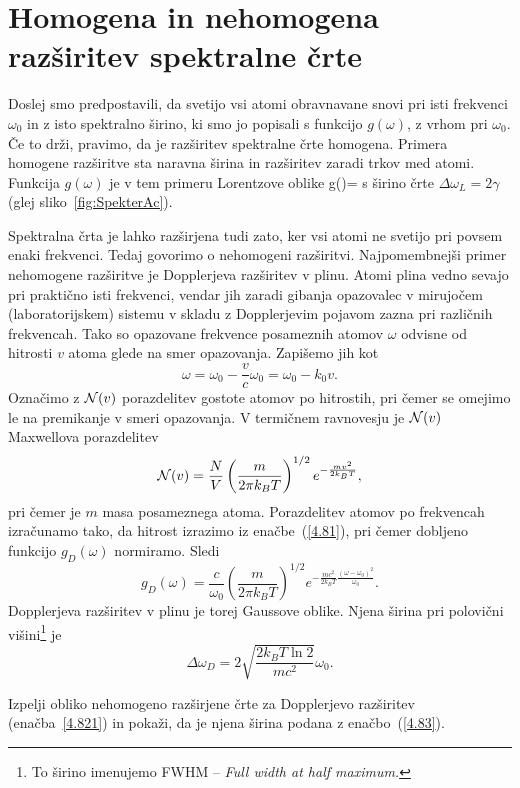 \section{Homogena in nehomogena razširitev spektralne črte}
\label{Razsiritev}
Doslej smo predpostavili, da svetijo vsi atomi obravnavane snovi
pri isti frekvenci $\omega_{0}$ in z isto spektralno širino, ki smo
jo popisali s funkcijo $g(\omega)$, z vrhom pri $\omega_0$. Če to drži, 
pravimo, da je razširitev spektralne črte homogena. 
Primera homogene razširitve sta naravna širina in razširitev zaradi trkov med atomi. 
Funkcija $g(\omega)$ je v tem primeru Lorentzove oblike 
\beq
g(\omega)=
\eeq
s širino črte $\Delta \omega_L = 2\gamma$ (glej sliko~\ref{fig:SpekterAc}). 

Spektralna črta je lahko razširjena tudi zato, ker vsi atomi ne svetijo
pri povsem enaki frekvenci. Tedaj govorimo o nehomogeni 
razširitvi.
Najpomembnejši primer nehomogene razširitve je Dopplerjeva 
 razširitev v plinu. 
Atomi plina vedno sevajo pri praktično isti frekvenci, vendar jih zaradi gibanja
opazovalec v mirujočem (laboratorijskem) sistemu v skladu z Dopplerjevim pojavom 
zazna pri različnih frekvencah. Tako so opazovane frekvence posameznih atomov $\omega$
odvisne od hitrosti $v$ atoma glede na smer opazovanja. Zapišemo jih kot  
\begin{equation}
\omega=\omega_{0}-\frac{v}{c}\omega_{0}=\omega_{0}-k_{0}v.
\label{4.81}
\end{equation}
Označimo z ${\cal N}(v)$ porazdelitev gostote atomov po hitrostih, pri čemer se omejimo 
le na premikanje v smeri opazovanja. V termičnem ravnovesju je ${\cal N}(v)$
Maxwellova porazdelitev
\begin{equation}
{\cal N}(v)=\frac{N}{V}\left(\frac{m}{2\pi k_{B}T}\right)^{1/2}e^{-\frac{mv^{2}}{2k_{B}T}},
\label{4.82}
\end{equation}
pri čemer je $m$ masa posameznega atoma.
Porazdelitev atomov po frekvencah izračunamo tako, da hitrost izrazimo
iz enačbe~(\ref{4.81}), pri čemer dobljeno funkcijo $g_{D}(\omega)$
normiramo. Sledi
\begin{equation}
g_{D}(\omega)=\frac{c}{\omega_{0}}\left(\frac{m}{2\pi 
k_{B}T}\right)^{1/2}e^{-\frac{mc^{2}}{2k_{B}T}\frac{(\omega-\omega_{0})^{2}}{\omega_{0}}}.
\label{4.821}
\end{equation}
Dopplerjeva razširitev v plinu je torej Gaussove oblike.
Njena širina pri polovični 
višini\footnote{To širino imenujemo FWHM -- \it{Full width at half maximum}.} je
\begin{equation} 
\Delta\omega_{D}=2 \sqrt{\frac{2k_{B}T \ln 2}{mc^{2}}}\omega_{0}.
\label{4.83}
\end{equation}
\begin{definition}
Izpelji obliko nehomogeno razširjene črte za Dopplerjevo razširitev (enačba~\ref{4.821})
in pokaži, da je njena širina podana z enačbo~(\ref{4.83}).
\end{definition}

